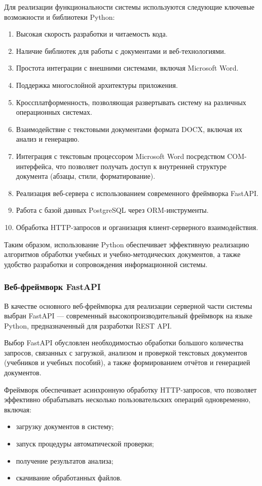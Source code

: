 Для реализации функциональности системы используются следующие ключевые возможности и библиотеки Python:
\begin{enumerate}
	\item Высокая скорость разработки и читаемость кода.
	\item Наличие библиотек для работы с документами и веб-технологиями.
	\item Простота интеграции с внешними системами, включая Microsoft Word.
	\item Поддержка многослойной архитектуры приложения.
	\item Кроссплатформенность, позволяющая развертывать систему на различных операционных системах.
	\item Взаимодействие с текстовыми документами формата DOCX, включая их анализ и генерацию.
	\item Интеграция с текстовым процессором Microsoft Word посредством COM-интерфейса, что позволяет получать доступ к внутренней структуре документа (абзацы, стили, форматирование).
	\item Реализация веб-сервера с использованием современного фреймворка FastAPI.
	\item Работа с базой данных PostgreSQL через ORM-инструменты.
	\item Обработка HTTP-запросов и организация клиент-серверного взаимодействия.
\end{enumerate}

Таким образом, использование Python обеспечивает эффективную реализацию алгоритмов обработки учебных и учебно-методических документов, а также удобство разработки и сопровождения информационной системы.

\subsubsection{Веб-фреймворк FastAPI}

В качестве основного веб-фреймворка для реализации серверной части системы выбран FastAPI — современный высокопроизводительный фреймворк на языке Python, предназначенный для разработки REST API.

Выбор FastAPI обусловлен необходимостью обработки большого количества запросов, связанных с загрузкой, анализом и проверкой текстовых документов (учебников и учебных пособий), а также формированием отчётов и генерацией документов.

Фреймворк обеспечивает асинхронную обработку HTTP-запросов, что позволяет эффективно обрабатывать несколько пользовательских операций одновременно, включая:
\begin{itemize}
	\item загрузку документов в систему;
	\item запуск процедуры автоматической проверки;
	\item получение результатов анализа;
	\item скачивание обработанных файлов.
\end{itemize}

